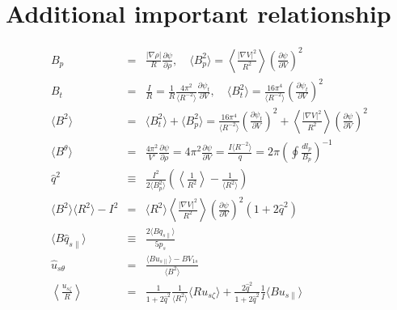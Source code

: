 \documentclass[11pt]{article}
\def\ave#1{\left\langle#1\right\rangle}
\def\aves#1{\langle#1\rangle}
\def\dd#1#2{\frac{\partial #1}{\partial #2}}
\def\para{\parallel}
\def\psit{\psi_t}
\def\uszt{u_{s\zeta}}
\def\uspara{u_{s\para}}
\def\bri{\aves{B^2}\aves{R^2} - I^2}
\begin{document}
\section{Additional important relationship}
\setcounter{equation}{0}

\begin{eqnarray}
  B_p &=&
%
  \frac{|\nabla\rho|}{R} \dd{\psi}{\rho},
  \quad
  \aves{B_p^2} =
%
  \ave{\frac{|\nabla V|^2}{R^2}} \left(\dd{\psi}{V}\right)^2
\\[5mm]
  B_t &=&
%
  \frac{I}{R}
%
  = \frac{1}{R} \frac{4\pi^2}{\aves{R^{-2}}} \dd{\psit}{V},
  \quad
  \aves{B_t^2} =
%
  \frac{16\pi^4}{\aves{R^{-2}}} \left(\dd{\psit}{V}\right)^2
\\[5mm]
  \aves{B^2} &=&
%
  \aves{B_t^2} + \aves{B_p^2}
%
  = \frac{16\pi^4}{\aves{R^{-2}}}\left(\dd{\psit}{V}\right)^2
  + \ave{\frac{|\nabla V|^2}{R^2}}\left(\dd{\psi}{V}\right)^2
\\[5mm]
  \aves{B^\theta} &=&
%
  \frac{4\pi^2}{V'} \dd{\psi}{\rho}
%
  = 4\pi^2 \dd{\psi}{V}
%
  = \frac{I\aves{R^{-2}}}{q}
%
  = 2\pi\left(\oint \frac{dl_p}{B_p}\right)^{-1}
\\[5mm]
  \hat{q}^2 &\equiv& \frac{I^2}{2\aves{B_p^2}}\left(\ave{\frac{1}{R^2}}-\frac{1}{\aves{R^2}}\right)
\\[5mm]
  \bri &=&
%
  \aves{R^2} \ave{\frac{|\nabla V|^2}{R^2}} \left(\dd{\psi}{V}\right)^2 (1+2\hat{q}^2)
\\[5mm]
 \aves{B\hat{q}_{s\para}} &\equiv&
%
 \frac{2\aves{Bq_{s\para}}}{5p_s}
\\[5mm]
  \hat{u}_{s\theta} &=&
%
  \frac{\aves{B\uspara} - BV_{1s}}{ \aves{B^2} }
\\[5mm]
  \ave{\frac{\uszt}{R}} &=&
%
  \frac{1}{1+2\hat{q}^2}\frac{1}{\aves{R^2}}\aves{R\uszt}+\frac{2\hat{q}^2}{1+2\hat{q}^2}\frac{1}{I}\aves{B\uspara}
\\[2.5mm]
%
%

\end{eqnarray}
\end{document}
